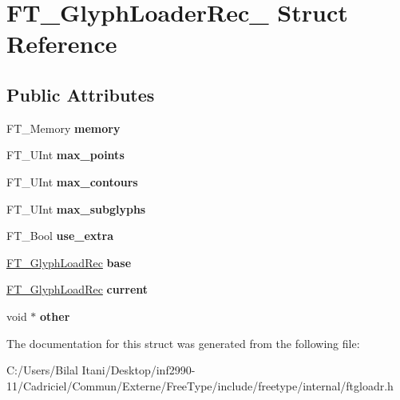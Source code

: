 \hypertarget{struct_f_t___glyph_loader_rec__}{}\section{F\+T\+\_\+\+Glyph\+Loader\+Rec\+\_\+ Struct Reference}
\label{struct_f_t___glyph_loader_rec__}
\subsection*{Public Attributes}
\begin{DoxyCompactItemize}
\item 
F\+T\+\_\+\+Memory {\bfseries memory}\hypertarget{struct_f_t___glyph_loader_rec___a9120a7808ee59d24dd52409e609907a2}{}\label{struct_f_t___glyph_loader_rec___a9120a7808ee59d24dd52409e609907a2}

\item 
F\+T\+\_\+\+U\+Int {\bfseries max\+\_\+points}\hypertarget{struct_f_t___glyph_loader_rec___a62339fa7a06e0b4ddecd5db2aa606741}{}\label{struct_f_t___glyph_loader_rec___a62339fa7a06e0b4ddecd5db2aa606741}

\item 
F\+T\+\_\+\+U\+Int {\bfseries max\+\_\+contours}\hypertarget{struct_f_t___glyph_loader_rec___a808ccf46597572d953f387e705f10a36}{}\label{struct_f_t___glyph_loader_rec___a808ccf46597572d953f387e705f10a36}

\item 
F\+T\+\_\+\+U\+Int {\bfseries max\+\_\+subglyphs}\hypertarget{struct_f_t___glyph_loader_rec___a2d5b00d7caf624ed2b4f6fd2db3228db}{}\label{struct_f_t___glyph_loader_rec___a2d5b00d7caf624ed2b4f6fd2db3228db}

\item 
F\+T\+\_\+\+Bool {\bfseries use\+\_\+extra}\hypertarget{struct_f_t___glyph_loader_rec___a54009985acda32d83f2f124e28c5d00a}{}\label{struct_f_t___glyph_loader_rec___a54009985acda32d83f2f124e28c5d00a}

\item 
\hyperlink{struct_f_t___glyph_load_rec__}{F\+T\+\_\+\+Glyph\+Load\+Rec} {\bfseries base}\hypertarget{struct_f_t___glyph_loader_rec___ae80dfc17f20bfce8c60ffaaba95c821b}{}\label{struct_f_t___glyph_loader_rec___ae80dfc17f20bfce8c60ffaaba95c821b}

\item 
\hyperlink{struct_f_t___glyph_load_rec__}{F\+T\+\_\+\+Glyph\+Load\+Rec} {\bfseries current}\hypertarget{struct_f_t___glyph_loader_rec___a271b1b9604746ed08cf6613710ebb4c1}{}\label{struct_f_t___glyph_loader_rec___a271b1b9604746ed08cf6613710ebb4c1}

\item 
void $\ast$ {\bfseries other}\hypertarget{struct_f_t___glyph_loader_rec___a9c58c5b06f0135fe5cef16bd85d939e3}{}\label{struct_f_t___glyph_loader_rec___a9c58c5b06f0135fe5cef16bd85d939e3}

\end{DoxyCompactItemize}


The documentation for this struct was generated from the following file\+:\begin{DoxyCompactItemize}
\item 
C\+:/\+Users/\+Bilal Itani/\+Desktop/inf2990-\/11/\+Cadriciel/\+Commun/\+Externe/\+Free\+Type/include/freetype/internal/ftgloadr.\+h\end{DoxyCompactItemize}
